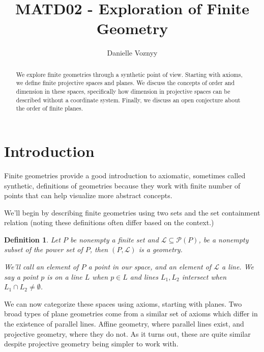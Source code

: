 \documentclass[12pt]{article}
\title{MATD02 - Exploration of Finite Geometry }
\author{Danielle Voznyy}
\date{}
\newtheorem{definition}{Definition}
\begin{document}
    \maketitle

    \begin{abstract}
        We explore finite geometries through a synthetic point of view.
        Starting with axioms, we define finite projective spaces and planes.
        We discuss the concepts of order and dimension in these spaces,
        specifically how dimension in projective spaces can be described without a coordinate system.
        Finally, we discuss an open conjecture about the order of finite planes.
    \end{abstract}


    \section{Introduction}

    Finite geometries provide a good introduction to axiomatic, sometimes called synthetic, definitions of geometries
    because they work with finite number of points that can help visualize more abstract concepts.

    We'll begin by describing finite geometries using two sets and the set containment relation
    (noting these definitions often differ based on the context.)

    \begin{definition}
        Let $P$ be nonempty a finite set and $\mathcal{L} \subseteq \mathcal{P}(P)$, be a nonempty subset of the power set of $P$,
        then $(P, \mathcal{L})$ is a geometry.

        We'll call an element of $P$ a point in our space, and an element of $\mathcal{L}$ a line.
        We say a point $p$ is on a line $L$ when $p \in L$ and lines $L_1, L_2$ intersect when $L_1 \cap L_2 \neq \emptyset$.
    \end{definition}

    We can now categorize these spaces using axioms, starting with planes.
    Two broad types of plane geometries come from a similar set of axioms which differ in the existence of parallel lines.
    Affine geometry, where parallel lines exist, and projective geometry, where they do not.
    As it turns out, these are quite similar despite projective geometry being simpler to work with\cite[p.~7]{beutelspacher_projective_2000}.
\end{document}
